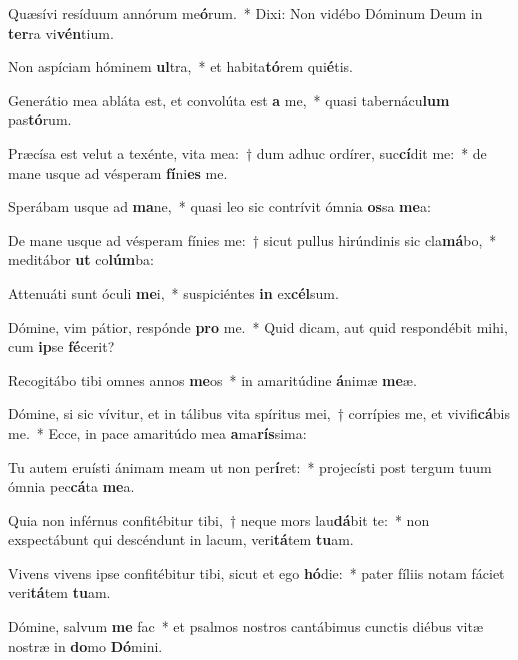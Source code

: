 \item Quæsívi resíduum annórum me\textbf{ó}rum.~* Dixi: Non vidébo Dóminum Deum in \textbf{ter}ra vi\textbf{vén}tium.
\item Non aspíciam hóminem \textbf{ul}tra,~* et habita\textbf{tó}rem qui\textbf{é}tis.
\item Generátio mea abláta est, et convolúta est \textbf{a} me,~* quasi tabernácu\textbf{lum} pas\textbf{tó}rum.
\item Præcísa est velut a texénte, vita mea:~† dum adhuc ordírer, suc\textbf{cí}dit me:~* de mane usque ad vésperam \textbf{fí}ni\textbf{es} me.
\item Sperábam usque ad \textbf{ma}ne,~* quasi leo sic contrívit ómnia \textbf{os}sa \textbf{me}a:
\item De mane usque ad vésperam fínies me:~† sicut pullus hirúndinis sic cla\textbf{má}bo,~* meditábor \textbf{ut} co\textbf{lúm}ba:
\item Attenuáti sunt óculi \textbf{me}i,~* suspiciéntes \textbf{in} ex\textbf{cél}sum.
\item Dómine, vim pátior, respónde \textbf{pro} me.~* Quid dicam, aut quid respondébit mihi, cum \textbf{ip}se \textbf{fé}cerit?
\item Recogitábo tibi omnes annos \textbf{me}os~* in amaritúdine \textbf{á}nimæ \textbf{me}æ.
\item Dómine, si sic vívitur, et in tálibus vita spíritus mei,~† corrípies me, et vivifi\textbf{cá}bis me.~* Ecce, in pace amaritúdo mea \textbf{a}ma\textbf{rís}sima:
\item Tu autem eruísti ánimam meam ut non per\textbf{í}ret:~* projecísti post tergum tuum ómnia pec\textbf{cá}ta \textbf{me}a.
\item Quia non inférnus confitébitur tibi,~† neque mors lau\textbf{dá}bit te:~* non exspectábunt qui descéndunt in lacum, veri\textbf{tá}tem \textbf{tu}am.
\item Vivens vivens ipse confitébitur tibi, sicut et ego \textbf{hó}die:~* pater fíliis notam fáciet veri\textbf{tá}tem \textbf{tu}am.
\item Dómine, salvum \textbf{me} fac~* et psalmos nostros cantábimus cunctis diébus vitæ nostræ in \textbf{do}mo \textbf{Dó}mini.
